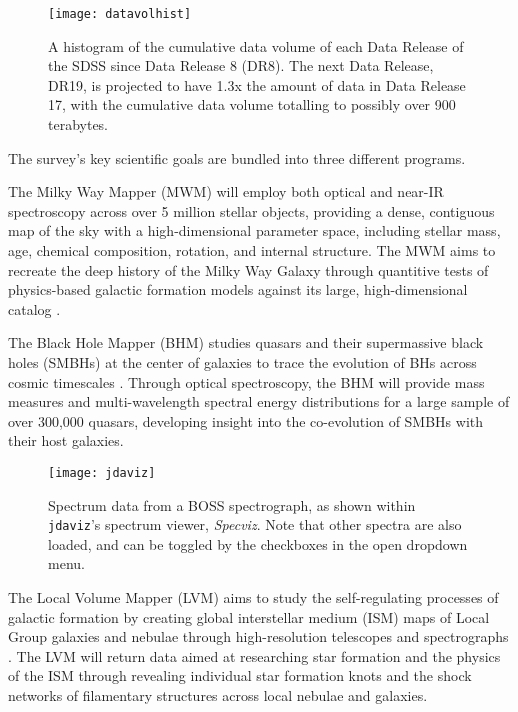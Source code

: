 \documentclass[a4paper,10pt,twocolumn]{article}
\newcommand{\jdaviz}{\texttt{jdaviz}}
\begin{document}
\begin{figure}[htpb]
	\centering
	\texttt{[image: datavolhist]}
	\caption{A histogram of the cumulative data volume of each Data Release of the SDSS since Data Release 8 (DR8). The next Data Release, DR19, is projected to have 1.3x the amount of data in Data Release 17, with the cumulative data volume totalling to possibly over 900 terabytes.}
	\label{fig:datavols}
\end{figure}
The survey's key scientific goals are bundled into three different programs.

The Milky Way Mapper (MWM) will employ both optical and near-IR spectroscopy across over 5 million stellar objects, providing a dense, contiguous map of the sky with a high-dimensional parameter space, including stellar mass, age, chemical composition, rotation, and internal structure. The MWM aims to recreate the deep history of the Milky Way Galaxy through quantitive tests of physics-based galactic formation models against its large, high-dimensional catalog \parencite{SDSS2017}.

The Black Hole Mapper (BHM) studies quasars and their supermassive black holes (SMBHs) at the center of galaxies to trace the evolution of BHs across cosmic timescales \parencite{SDSS2017}. Through optical spectroscopy, the BHM will provide mass measures and multi-wavelength spectral energy distributions for a large sample of over 300,000 quasars, developing insight into the co-evolution of SMBHs with their host galaxies.

\begin{figure*}[t]
	\centering
	\texttt{[image: jdaviz]}
	\caption{Spectrum data from a BOSS spectrograph, as shown within \jdaviz's spectrum viewer, \emph{Specviz}. Note that other spectra are also loaded, and can be toggled by the checkboxes in the open dropdown menu.}
	\label{fig:jdaviz}
\end{figure*}

The Local Volume Mapper (LVM) aims to study the self-regulating processes of galactic formation by creating global interstellar medium (ISM) maps of Local Group galaxies and nebulae through high-resolution telescopes and spectrographs \parencite{SDSS2017}. The LVM will return data aimed at researching star formation and the physics of the ISM through revealing individual star formation knots and the shock networks of filamentary structures across local nebulae and galaxies.
\end{document}
